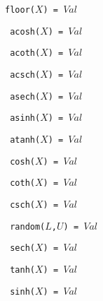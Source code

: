    \item \texttt{floor($X$) = $Val$} 
   \item \texttt{	acosh($X$) = $Val$} 
   \item \texttt{	acoth($X$) = $Val$} 
   \item \texttt{	acsch($X$) = $Val$} 
   \item \texttt{	asech($X$) = $Val$} 
   \item \texttt{	asinh($X$) = $Val$} 
   \item \texttt{	atanh($X$) = $Val$} 
   \item \texttt{	cosh($X$)  = $Val$} 
   \item \texttt{	coth($X$)  = $Val$} 
   \item \texttt{	csch($X$)  = $Val$} 
   \item \texttt{	random($L$,$U$) = $Val$} 
   \item \texttt{	sech($X$) = $Val$} 
   \item \texttt{	tanh($X$) = $Val$} 
   \item \texttt{    sinh($X$) = $Val$} 

